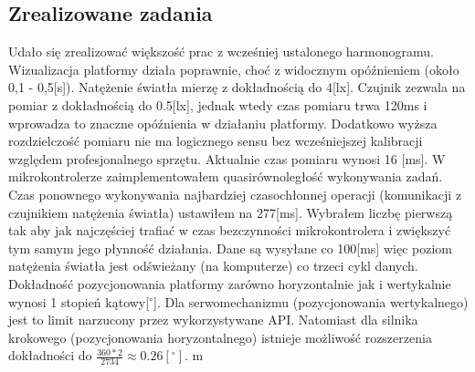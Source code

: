 \documentclass[10pt, a4paper]{article}
\begin{document}
	\subsection{Zrealizowane zadania}
	Udało się zrealizować większość prac z wcześniej ustalonego harmonogramu. Wizualizacja platformy działa poprawnie, choć z widocznym opóźnieniem (około 0,1 - 0,5[s]). Natężenie światła mierzę z dokładnością do 4[lx]. Czujnik zezwala na pomiar z dokładnością do 0.5[lx], jednak wtedy czas pomiaru trwa 120ms i wprowadza to znaczne opóźnienia w działaniu platformy. Dodatkowo wyższa rozdzielczość pomiaru nie ma logicznego sensu bez wcześniejszej kalibracji względem profesjonalnego sprzętu. Aktualnie czas pomiaru wynosi 16 [ms]. W mikrokontrolerze zaimplementowałem quasirównoległość wykonywania zadań. Czas ponownego wykonywania najbardziej czasochłonnej operacji (komunikacji z czujnikiem natężenia światła) ustawiłem na 277[ms]. Wybrałem liczbę pierwszą tak aby jak najczęściej trafiać w czas bezczynności mikrokontrolera i zwiększyć tym samym jego płynność działania. Dane są wysyłane co 100[ms] więc poziom natężenia światła jest odświeżany (na komputerze) co trzeci cykl danych. \\
	Dokładność pozycjonowania platformy zarówno horyzontalnie jak i wertykalnie wynosi 1 stopień kątowy[$^{\circ}$]. Dla serwomechanizmu (pozycjonowania wertykalnego) jest to limit narzucony przez wykorzystywane API. Natomiast dla silnika krokowego (pozycjonowania horyzontalnego) istnieje możliwość rozszerzenia dokładności do $\frac{360 * 2}{2734} \approx 0.26[^{\circ}]$.
	\unit[5]{m}
\end{document}
